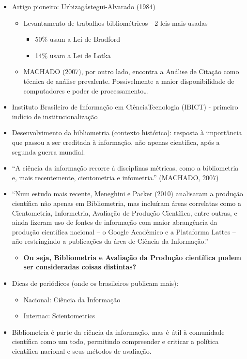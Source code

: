 \documentclass[11pt]{article}
\begin{document}
\begin{itemize}
\item Artigo pioneiro: Urbizagástegui-Alvarado (1984)

\begin{itemize}
\item Levantamento de trabalhos bibliométricos - 2 leis mais usadas

\begin{itemize}
\item 50\% usam a Lei de Bradford

\item 14\% usam a Lei de Lotka
\end{itemize}

\item MACHADO (2007), por outro lado, encontra a Análise de Citação como técnica de análise prevalente. Possivelmente a maior disponibilidade de computadores e poder de processamento\ldots{}
\end{itemize}

\item Instituto Brasileiro de Informação em CiênciaTecnologia (IBICT) - primeiro indício de institucionalização

\item Desenvolvimento da bibliometria (contexto histórico): resposta à importância que passou a ser creditada à informação, não apenas científica, após a segunda guerra mundial.

\item ``A ciência da informação recorre à disciplinas métricas, como a bibliometria e, mais recentemente, cientometria e infometria.'' (MACHADO, 2007)

\item ``Num estudo mais recente, Meneghini e Packer (2010) analisaram a produção científica não apenas em Bibliometria, mas incluíram áreas correlatas como a Cientometria, Informetria, Avaliação de Produção Científica, entre outras, e ainda fizeram uso de fontes de informação com maior abrangência da produção científica nacional – o Google Acadêmico e a Plataforma Lattes – não restringindo a publicações da área de Ciência da Informação.''

\begin{itemize}
\item \textbf{Ou seja, Bibliometria e Avaliação da Produção científica podem ser consideradas coisas distintas?}
\end{itemize}

\item Dicas de periódicos (onde os brasileiros publicam mais):

\begin{itemize}
\item Nacional: Ciência da Informação

\item Internac: Scientometrics
\end{itemize}

\item Bibliometria é parte da ciência da informação, mas é útil à comunidade científica como um todo, permitindo compreender e criticar a política científica nacional e seus métodos de avaliação.
\end{itemize}
\end{document}
